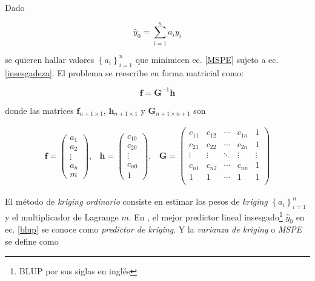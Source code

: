 \documentclass[14pt]{extarticle}
\begin{document}
Dado 

\begin{equation}
	\hat{y}_0 = \sum_{i=1}^{n} a_i y_i\label{blup}
\end{equation}

\noindent se quieren hallar valores $\left\lbrace a_i \right\rbrace_{i=1}^{n}$ que minimicen ec. \ref{MSPE} sujeto a ec. \ref{insesgadeza}. El problema se reescribe en forma matricial como:

\begin{equation}
	\mathbf{f} = \mathbf{G}^{-1}\mathbf{h}\label{ecuacion_predictiva}
\end{equation}

\noindent donde las matrices $\mathbf{f}_{n+1\times 1}$, $\mathbf{h}_{n+1\times 1}$ y $\mathbf{G}_{n+1\times n+1}$ son

\begin{eqnarray}
	\mathbf{f} = \begin{pmatrix}
	a_1 \\ a_2 \\ \vdots\\ a_n \\ m
	\end{pmatrix}, & \mathbf{h} = \begin{pmatrix}
	c_{10} \\ c_{20} \\ \vdots \\ c_{n0} \\ 1
	\end{pmatrix}, & \mathbf{G} = \begin{pmatrix}
	c_{11} & c_{12} & \cdots & c_{1n} & 1\\
	c_{21} & c_{22} & \cdots & c_{2n} & 1\\
	\vdots & \vdots & \ddots & \vdots & \vdots\\
	c_{n1} & c_{n2} & \cdots & c_{nn} & 1\\
	1 & 1 & \cdots & 1 & 1\\
	\end{pmatrix}
\end{eqnarray}

El método de \textit{kriging ordinario} consiste en estimar los pesos de \textit{kriging} $\left\lbrace a_i \right\rbrace_{i=1}^n$ y el multiplicador de Lagrange $m$\cite{Brus.2022, Thompson.2012}. En \cite{Thompson.2012}, el mejor predictor lineal insesgado\footnote{BLUP por sus siglas en inglés} $\hat{y}_0$ en ec. \ref{blup} se conoce como \textit{predictor de kriging}. Y la \textit{varianza de kriging} o \textit{MSPE} se define como
\end{document}
